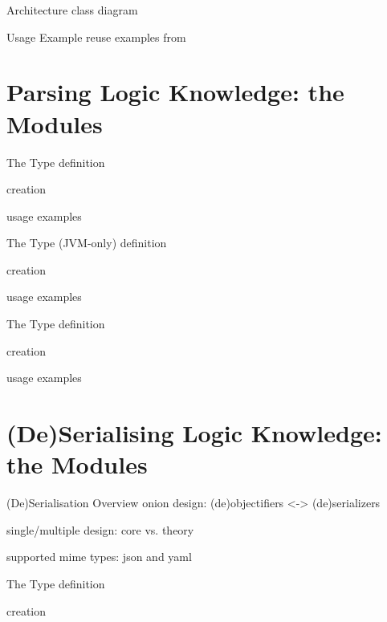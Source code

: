 \documentclass[handout]{beamer}
\begin{document}
\begin{frame}[allowframebreaks]{Architecture}
    class diagram
\end{frame}

\begin{frame}[allowframebreaks]{Usage Example}
    reuse examples from \cite{kotlinDSl4PrologWoa2020}
\end{frame}

\section{Parsing Logic Knowledge: the  Modules}

\begin{frame}[allowframebreaks]{The  Type}
    definition

    creation

    usage examples
\end{frame}

\begin{frame}[allowframebreaks]{The  Type (JVM-only)}
    definition

    creation

    usage examples
\end{frame}

\begin{frame}[allowframebreaks]{The  Type}
    definition

    creation

    usage examples
\end{frame}

\section{(De)Serialising Logic Knowledge: the  Modules}

\begin{frame}[allowframebreaks]{(De)Serialisation Overview}
    onion design: (de)objectifiers <-> (de)serializers

    single/multiple design: core vs. theory

    supported mime types: json and yaml
\end{frame}

\begin{frame}[allowframebreaks]{The  Type}
    definition

    creation
\end{frame}
\end{document}
